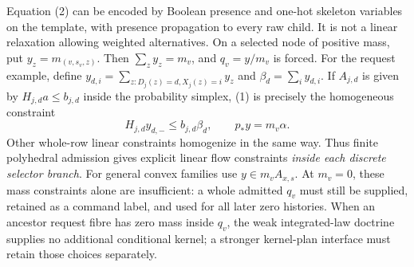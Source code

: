 \documentclass[11pt]{article}
\begin{document}
Equation (2) can be encoded by Boolean presence and one-hot skeleton variables on the template, with presence propagation to every raw child. It is not a linear relaxation allowing weighted alternatives. On a selected node of positive mass, put $y_z=m_{(v,s_v,z)}$. Then $\sum_z y_z=m_v$, and $q_v=y/m_v$ is forced. For the request example, define $y_{d,i}=\sum_{z:D_j(z)=d,X_j(z)=i}y_z$ and $\beta_d=\sum_i y_{d,i}$. If $A_{j,d}$ is given by $H_{j,d}a\leq b_{j,d}$ inside the probability simplex, (1) is precisely the homogeneous constraint
\[
         H_{j,d}y_{d,-}\leq b_{j,d}\beta_d,\qquad
         p_*y=m_v\alpha.                               \tag{5}
\]
Other whole-row linear constraints homogenize in the same way. Thus finite polyhedral admission gives explicit linear flow constraints \emph{inside each discrete selector branch}. For general convex families use $y\in m_v A_{x,s}$. At $m_v=0$, these mass constraints alone are insufficient: a whole admitted $q_v$ must still be supplied, retained as a command label, and used for all later zero histories. When an ancestor request fibre has zero mass inside $q_v$, the weak integrated-law doctrine supplies no additional conditional kernel; a stronger kernel-plan interface must retain those choices separately.
\end{document}
